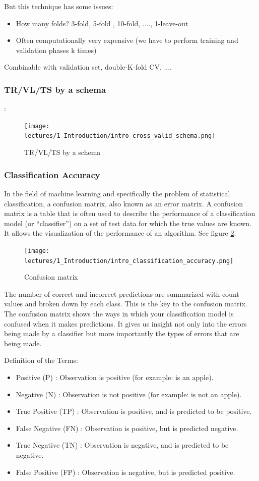 \documentclass[../main.tex]{subfiles}
\begin{document}
But this technique has some issues: 
\begin{itemize}
    \item How many folds? 3-fold, 5-fold , 10-fold, ...., 1-leave-out
    \item Often computationally very expensive (we have to perform training and validation phases k times)
\end{itemize}

Combinable with validation set, double-K-fold CV, ....


\subsubsection{TR/VL/TS by a schema}:
\begin{figure}[H]
    \centering
    \texttt{[image: lectures/1\_Introduction/intro\_cross\_valid\_schema.png]}
    \caption{TR/VL/TS by a schema}
    \label{fig:intro_cross_valid_schema}
\end{figure}

\subsubsection{Classification Accuracy}
In the field of machine learning and specifically the problem of statistical classification, a confusion matrix, also known as an error matrix.
A confusion matrix is a table that is often used to describe the performance of a classification model (or “classifier”) on a set of test data for which the true values are known. It allows the visualization of the performance of an algorithm. See figure \ref{fig:Confusion matrix}.

\begin{figure}[H]
    \centering
    \texttt{[image: lectures/1\_Introduction/intro\_classification\_accuracy.png]}
    \caption{Confusion matrix}
    \label{fig:Confusion matrix}
\end{figure}
The number of correct and incorrect predictions are summarized with count values and broken down by each class. This is the key to the confusion matrix.
The confusion matrix shows the ways in which your classification model is confused when it makes predictions.
It gives us insight not only into the errors being made by a classifier but more importantly the types of errors that are being made.

Definition of the Terms:
\begin{itemize}
    \item Positive (P) : Observation is positive (for example: is an apple).
    \item Negative (N) : Observation is not positive (for example: is not an apple).
    \item True Positive (TP) : Observation is positive, and is predicted to be positive.
    \item False Negative (FN) : Observation is positive, but is predicted negative.
    \item True Negative (TN) : Observation is negative, and is predicted to be negative.
    \item False Positive (FP) : Observation is negative, but is predicted positive.
\end{itemize}
\end{document}
